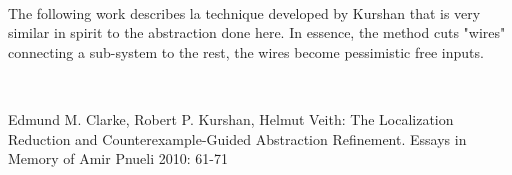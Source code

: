 \begin{enumerate}
~

The following work describes la technique developed by Kurshan that is very similar in spirit to the abstraction done here. In essence, the method cuts "wires" connecting a sub-system to the rest, the wires become pessimistic free inputs.

~

Edmund M. Clarke, Robert P. Kurshan, Helmut Veith:
The Localization Reduction and Counterexample-Guided Abstraction Refinement. Essays in Memory of Amir Pnueli 2010: 61-71


~


\end{enumerate}
